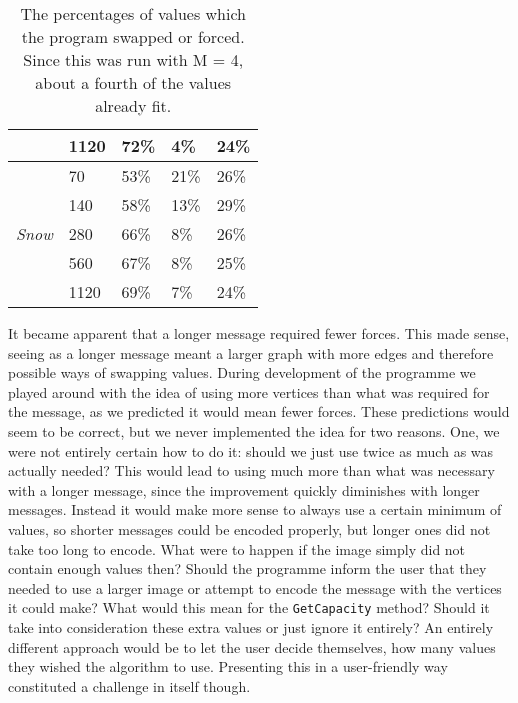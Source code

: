 \begin{table}[]
\begin{tabular}{@{}lllll@{}}
                                    & 1120                    & 72\%           & 4\%             & 24\%                 \\ \midrule
\multirow{5}{*}{\textit{Snow}}      & 70                      & 53\%           & 21\%            & 26\%                 \\
                                    & 140                     & 58\%           & 13\%            & 29\%                 \\
                                    & 280                     & 66\%           & 8\%             & 26\%                 \\
                                    & 560                     & 67\%           & 8\%             & 25\%                 \\
                                    & 1120                    & 69\%           & 7\%             & 24\%                 \\ \bottomrule
\end{tabular}
	\caption{The percentages of values which the program swapped or forced. Since this was run with M = 4, about a fourth of the values already fit.}
	\label{fig:forces_swaps}
\end{table}

It became apparent that a longer message required fewer forces. 
This made sense, seeing as a longer message meant a larger graph with more edges and therefore possible ways of swapping values.
During development of the programme we played around with the idea of using more vertices than what was required for the message, as we predicted it would mean fewer forces.
These predictions would seem to be correct, but we never implemented the idea for two reasons.
One, we were not entirely certain how to do it: should we just use twice as much as was actually needed?
This would lead to using much more than what was necessary with a longer message, since the improvement quickly diminishes with longer messages.
Instead it would make more sense to always use a certain minimum of values, so shorter messages could be encoded properly, but longer ones did not take too long to encode.
What were to happen if the image simply did not contain enough values then? 
Should the programme inform the user that they needed to use a larger image or attempt to encode the message with the vertices it could make?
What would this mean for the \lstinline|GetCapacity| method? 
Should it take into consideration these extra values or just ignore it entirely?
An entirely different approach would be to let the user decide themselves, how many values they wished the algorithm to use. 
Presenting this in a user-friendly way constituted a challenge in itself though.

